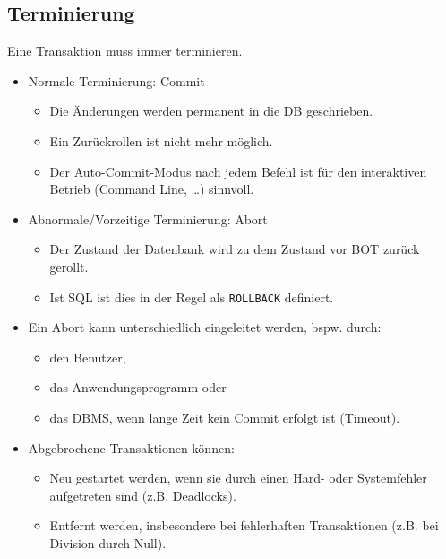         \subsection{Terminierung} %
        	Eine Transaktion muss immer terminieren.
            \begin{itemize}
            	\item Normale Terminierung: Commit
            		\begin{itemize}
            			\item Die Änderungen werden permanent in die DB geschrieben.
            			\item Ein Zurückrollen ist nicht mehr möglich.
            			\item Der Auto-Commit-Modus nach jedem Befehl ist für den interaktiven Betrieb (Command Line, \dots) sinnvoll.
            		\end{itemize}
            	\item Abnormale/Vorzeitige Terminierung: Abort
            		\begin{itemize}
            			\item Der Zustand der Datenbank wird zu dem Zustand vor BOT zurück gerollt.
            			\item Ist SQL ist dies in der Regel als \lstinline|ROLLBACK| definiert.
            		\end{itemize}
            	\item Ein Abort kann unterschiedlich eingeleitet werden, bspw. durch:
            		\begin{itemize}
            			\item den Benutzer,
            			\item das Anwendungsprogramm oder
            			\item das DBMS, wenn lange Zeit kein Commit erfolgt ist (Timeout).
            		\end{itemize}
            	\item Abgebrochene Transaktionen können:
            		\begin{itemize}
            			\item Neu gestartet werden, wenn sie durch einen Hard- oder Systemfehler aufgetreten sind (z.B. Deadlocks).
            			\item Entfernt werden, insbesondere bei fehlerhaften Transaktionen (z.B. bei Division durch Null).
            		\end{itemize}
            \end{itemize}


